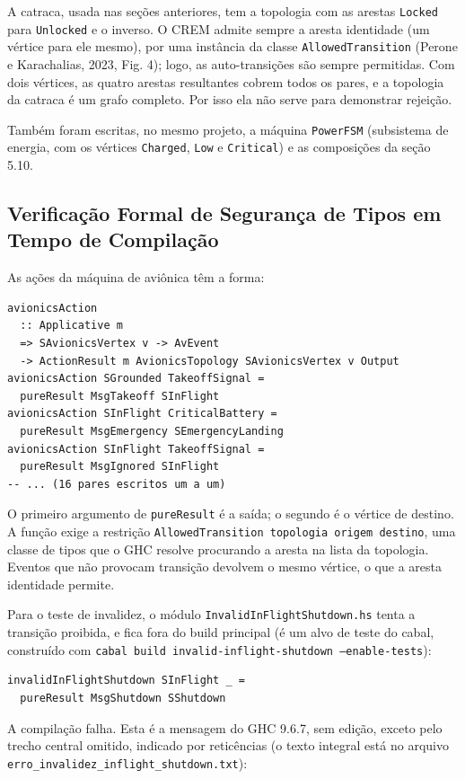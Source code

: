 \documentclass[12pt,a4paper]{article}
\begin{document}
A catraca, usada nas seções anteriores, tem a topologia com as arestas \texttt{Locked} para \texttt{Unlocked} e o inverso. O CREM admite sempre a aresta identidade (um vértice para ele mesmo), por uma instância da classe \texttt{AllowedTransition} (Perone e Karachalias, 2023, Fig. 4); logo, as auto-transições são sempre permitidas. Com dois vértices, as quatro arestas resultantes cobrem todos os pares, e a topologia da catraca é um grafo completo. Por isso ela não serve para demonstrar rejeição.

Também foram escritas, no mesmo projeto, a máquina \texttt{PowerFSM} (subsistema de energia, com os vértices \texttt{Charged}, \texttt{Low} e \texttt{Critical}) e as composições da seção 5.10.

\subsection{Verificação Formal de Segurança de Tipos em Tempo de Compilação}

As ações da máquina de aviônica têm a forma:

\begin{verbatim}
avionicsAction
  :: Applicative m
  => SAvionicsVertex v -> AvEvent
  -> ActionResult m AvionicsTopology SAvionicsVertex v Output
avionicsAction SGrounded TakeoffSignal =
  pureResult MsgTakeoff SInFlight
avionicsAction SInFlight CriticalBattery =
  pureResult MsgEmergency SEmergencyLanding
avionicsAction SInFlight TakeoffSignal =
  pureResult MsgIgnored SInFlight
-- ... (16 pares escritos um a um)
\end{verbatim}

O primeiro argumento de \texttt{pureResult} é a saída; o segundo é o vértice de destino. A função exige a restrição \texttt{AllowedTransition topologia origem destino}, uma classe de tipos que o GHC resolve procurando a aresta na lista da topologia. Eventos que não provocam transição devolvem o mesmo vértice, o que a aresta identidade permite.

Para o teste de invalidez, o módulo \texttt{InvalidInFlightShutdown.hs} tenta a transição proibida, e fica fora do build principal (é um alvo de teste do cabal, construído com \texttt{cabal build invalid-inflight-shutdown --enable-tests}):

\begin{verbatim}
invalidInFlightShutdown SInFlight _ =
  pureResult MsgShutdown SShutdown
\end{verbatim}

A compilação falha. Esta é a mensagem do GHC 9.6.7, sem edição, exceto pelo trecho central omitido, indicado por reticências (o texto integral está no arquivo \texttt{erro\_invalidez\_inflight\_shutdown.txt}):
\end{document}
